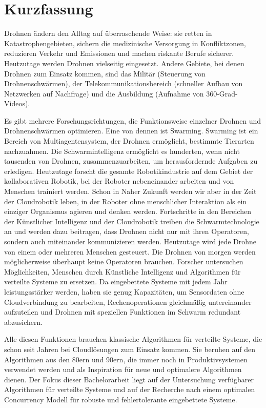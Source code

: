 \chapter{Kurzfassung}


Drohnen ändern den Alltag auf überraschende Weise: sie retten in Katastrophengebieten, sichern die medizinische Versorgung in Konfliktzonen, reduzieren Verkehr und Emissionen und machen riskante Berufe sicherer. Heutzutage werden Drohnen vielseitig eingesetzt. Andere Gebiete, bei denen Drohnen zum Einsatz kommen, sind das Militär (Steuerung von Drohnenschwärmen), der Telekommunikationsbereich (schneller Aufbau von Netzwerken auf Nachfrage) und die Ausbildung (Aufnahme von 360-Grad-Videos).


\noindent
Es gibt mehrere Forschungsrichtungen, die Funktionsweise einzelner Drohnen und Drohnenschwärmen optimieren. Eine von dennen ist Swarming. Swarming ist ein Bereich von Multiagentensystem, der Drohnen ermöglicht, bestimmte Tierarten nachzuahmen. Die Schwarmintelligenz ermöglicht es hunderten, wenn nicht tausenden von Drohnen, zusammenzuarbeiten, um herausfordernde Aufgaben zu erledigen. Heutzutage forscht die gesamte Robotikindustrie auf dem Gebiet der kollaborativen Robotik, bei der Roboter nebeneinander arbeiten und von Menschen trainiert werden. Schon in Naher Zukunft werden wir aber in der Zeit der Cloudrobotik leben, in der Roboter ohne menschlicher Interaktion als ein einziger Organismus agieren und denken werden. Fortschritte in den Bereichen der Künstlicher Intelligenz und der Cloudrobotik treiben die Schwarmtechnologie an und werden dazu beitragen, dass Drohnen nicht nur mit ihren Operatoren, sondern auch miteinander kommunizieren werden. Heutzutage wird jede Drohne von einem oder mehreren Menschen gesteuert. Die Drohnen von morgen werden möglicherweise überhaupt keine Operatoren brauchen. Forscher untersuchen Möglichkeiten, Menschen durch Künstliche Intelligenz und Algorithmen für verteilte Systeme zu ersetzen. Da eingebettete Systeme mit jedem Jahr leistungsstärker werden, haben sie genug Kapazitäten, um Sensordaten ohne Cloudverbindung zu bearbeiten, Rechenoperationen gleichmäßig untereinander aufzuteilen und Drohnen mit speziellen Funktionen im Schwarm redundant abzusichern. 


\noindent
Alle diesen Funktionen brauchen klassische Algorithmen für verteilte Systeme, die schon seit Jahren bei Cloudlösungen zum Einsatz kommen. Sie beruhen auf den Algorithmen aus den 80ern und 90ern, die immer noch in Produktivsystemen verwendet werden und als Inspiration für neue und optimalere Algorithmen dienen. Der Fokus dieser Bachelorarbeit liegt auf der Untersuchung verfügbarer Algorithmen für verteilte Systeme und auf der Recherche nach einem optimalen Concurrency Modell für robuste und fehlertolerante eingebettete Systeme.
